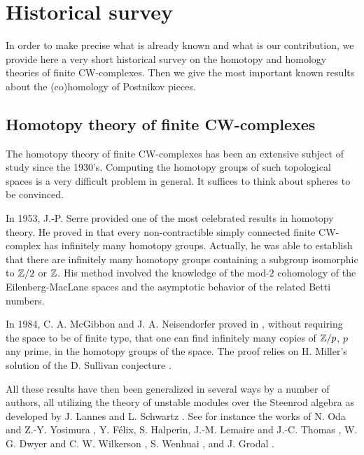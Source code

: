\section{Historical survey}

In order to make precise what is already known and what is our contribution, we provide here a very short historical survey on the homotopy and homology theories of finite CW-complexes. Then we give the most important known results about the (co)homology of Postnikov pieces.

\subsection{Homotopy theory of finite CW-complexes}
The homotopy theory of finite CW-complexes has been an extensive subject of study since the 1930's. Computing the homotopy groups of such topological spaces is a very difficult problem in general. It suffices to think about spheres to be convinced. 

In 1953, J.-P. Serre provided one of the most celebrated results in homotopy theory. He proved in  \cite{Se53} that every non-contractible simply connected finite CW-complex has infinitely many homotopy groups. Actually, he was able to establish that there are infinitely many homotopy groups containing a subgroup isomorphic to $\mathbb{Z}/2$ or $\mathbb{Z}$. His method involved the knowledge of the mod-$2$ cohomology of the Eilenberg-MacLane spaces and the asymptotic behavior of the related Betti numbers. 

In 1984, C. A. McGibbon and J. A. Neisendorfer proved in \cite{MN84}, without requiring the space to be of finite type, that one can find infinitely many copies of $\mathbb{Z}/p$, $p$ any prime, in the homotopy groups of the space. The proof relies on H. Miller's solution of the D. Sullivan conjecture \cite{Mi84}. 

All these results have then been generalized in several ways by a number of authors, all utilizing the theory of unstable modules over the Steenrod algebra as developed by J. Lannes and L. Schwartz \cite{LS86} \cite{LS89}. See for instance the works of N. Oda and Z.-Y. Yosimura \cite{OY86}, Y. F\'elix, S. Halperin, J.-M. Lemaire and J.-C. Thomas \cite{FHLT89}, W. G. Dwyer and C. W. Wilkerson \cite{DW90}, S. Wenhuai \cite{We94}, and J. Grodal \cite{Gr97}. 

